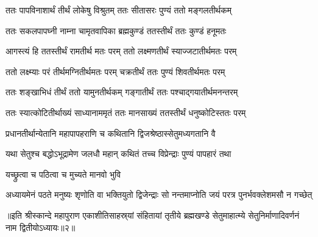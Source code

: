 \twolineshloka
{ततः पापविनाशार्थं तीर्थं लोकेषु विश्रुतम्}
{ततः सीतासरः पुण्यं ततो मङ्गलतीर्थकम्}%

\twolineshloka
{ततः सकलपापघ्नी नाम्ना चामृतवापिका}
{ब्रह्मकुण्डं ततस्तीर्थं ततः कुण्डं हनूमतः}%

\twolineshloka
{आगस्त्यं हि ततस्तीर्थं रामतीर्थ मतः परम्}
{ततो लक्ष्मणतीर्थं स्याज्जटातीर्थमतः परम्}%

\twolineshloka
{ततो लक्ष्म्याः परं तीर्थमग्नितीर्थमतः परम्}
{चक्रतीर्थं ततः पुण्यं शिवतीर्थमतः परम्}%

\twolineshloka
{ततः शङ्खाभिधं तीर्थं ततो यामुनतीर्थकम्}
{गङ्गातीर्थं ततः पश्चाद्गयातीर्थमनन्तरम्}%

\twolineshloka
{ततः स्यात्कोटितीर्थाख्यं साध्यानाममृतं ततः}
{मानसाख्यं ततस्तीर्थं धनुष्कोटिस्ततः परम्}%

\twolineshloka
{प्रधानतीर्थान्येतानि महापापहराणि च}
{कथितानि द्विजश्रेष्ठास्सेतुमध्यगतानि वै}%

\twolineshloka
{यथा सेतुश्च बद्धोऽभूद्रामेण जलधौ महान्}
{कथितं तच्च विप्रेन्द्राः पुण्यं पापहारं तथा}%

\onelineshloka
{यच्छ्रुत्वा च पठित्वा च मुच्यते मानवो भुवि}%

\twolineshloka
{अध्यायमेनं पठते मनुष्यः शृणोति वा भक्तियुतो द्विजेन्द्राः}
{सो नन्तमाप्नोति जयं परत्र पुनर्भवक्लेशमसौ न गच्छेत्}%

॥इति श्रीस्कान्दे महापुराण एकाशीतिसाहस्र्यां संहितायां तृतीये ब्रह्मखण्डे सेतुमाहात्म्ये सेतुनिर्माणादिवर्णनं नाम द्वितीयोऽध्यायः॥२॥
